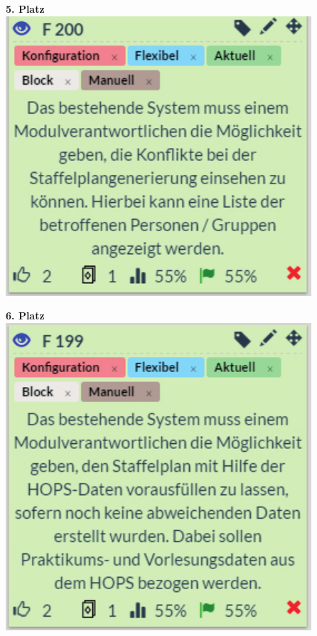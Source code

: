 \begin{minipage}[t]{.5\textwidth}
	\centering
   \vspace{16pt}
   		\textbf{5. Platz}\\
   		\vspace{16pt}
		\includegraphics[width=\textwidth]{images/5.pdf}
\end{minipage}
\begin{minipage}[t]{.5\textwidth}
	\centering
   \vspace{16pt}
   		\textbf{6. Platz}\\
   		\vspace{16pt}
		\includegraphics[width=\textwidth]{images/6.pdf}
\end{minipage}



